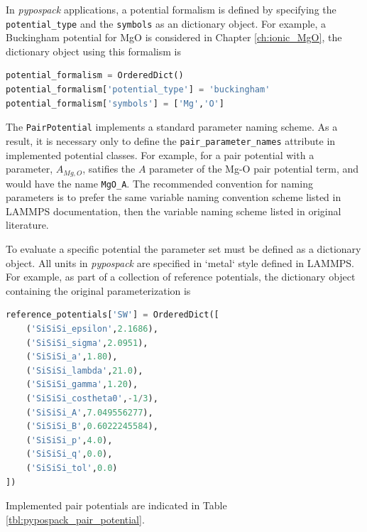 In \emph{pypospack} applications, a potential formalism is defined by specifying the \verb|potential_type| and the \verb|symbols| as an dictionary object.  For example, a Buckingham potential for MgO is considered in Chapter \ref{ch:ionic_MgO}, the dictionary object using this formalism is

\begin{lstlisting}[language=Python]
potential_formalism = OrderedDict()
potential_formalism['potential_type'] = 'buckingham'
potential_formalism['symbols'] = ['Mg','O']
\end{lstlisting}

The \verb|PairPotential| implements a standard parameter naming scheme.  As a result, it is necessary only to define the \verb|pair_parameter_names| attribute in implemented potential classes.  For example, for a pair potential with a parameter, $A_{Mg,O}$, satifies the $A$ parameter of the Mg-O pair potential term, and would have the name \verb|MgO_A|.  The recommended convention for naming parameters is to prefer the same variable naming convention scheme listed in LAMMPS documentation, then the variable naming scheme listed in original literature.

To evaluate a specific potential the parameter set must be defined as a dictionary object.  All units in \emph{pypospack} are specified in `metal` style defined in LAMMPS\cite	{lammps_units}.  For example, as part of a collection of reference potentials, the dictionary object containing the original parameterization is

\begin{lstlisting}[language=Python]
reference_potentials['SW'] = OrderedDict([
    ('SiSiSi_epsilon',2.1686),
    ('SiSiSi_sigma',2.0951),
    ('SiSiSi_a',1.80),
    ('SiSiSi_lambda',21.0),
    ('SiSiSi_gamma',1.20),
    ('SiSiSi_costheta0',-1/3),
    ('SiSiSi_A',7.049556277),
    ('SiSiSi_B',0.6022245584),
    ('SiSiSi_p',4.0),
    ('SiSiSi_q',0.0),
    ('SiSiSi_tol',0.0)
])
\end{lstlisting}

Implemented pair potentials are indicated in Table \ref{tbl:pypospack_pair_potential}.


